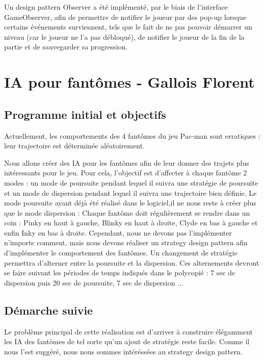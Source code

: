 \documentclass[a4paper,12pt]{report} %
\begin{document}
Un design pattern Observer a été implémenté, par le biais de l'interface
GameObserver, afin de permettre de notifier le joueur par des pop-up
lorsque certains événements surviennent, tels que le fait de ne pas
pouvoir démarrer un niveau (car le joueur ne l'a pas débloqué), de
notifier le joueur de la fin de la partie et de sauvegarder sa progression.


\section{IA pour fantômes - Gallois Florent}
\subsection{Programme initial et objectifs}
Actuellement, les comportements des 4 fantômes du jeu Pac-man sont erratiques : 
leur trajectoire est déterminée aléatoirement.

Nous allons créer des IA pour les fantômes afin de leur donner des trajets plus intéressants pour le jeu.
Pour cela, l'objectif est d'affecter à chaque fantôme 2 modes : un mode de poursuite pendant lequel il suivra une stratégie de poursuite et un mode de dispersion pendant lequel il suivra une trajectoire bien définie.
Le mode poursuite ayant déjà été réalisé dans le logiciel,il ne nous reste à créer plus que le mode dispersion : 
Chaque fantôme doit régulièrement se rendre dans un coin : Pinky en haut à gauche, Blinky en haut à droite, Clyde en bas à gauche et enfin Inky en bas à droite.
Cependant, nous ne devons pas l'implémenter n'importe comment, mais nous devons réaliser un strategy design pattern afin d'implémenter le comportement des fantômes.
Un changement de stratégie permettra d'alterner entre la poursuite et la dispersion.
Ces alternements devront se faire suivant les périodes de temps indiqués dans le polycopié : 7 sec de dispersion puis 20 sec de poursuite, 7 sec de dispersion ... 

\subsection{Démarche suivie}
Le problème principal de cette réalisation est d'arriver à construire élégamment les IA des fantômes de tel sorte qu'un ajout de stratégie reste facile.
Comme il nous l'est suggéré, nous nous sommes intéréssées au strategy design pattern.
\end{document}
